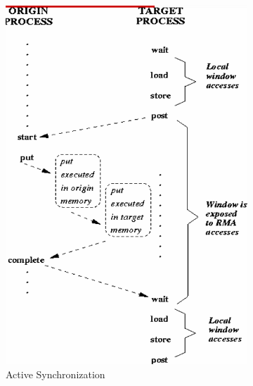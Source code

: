 \documentclass[12pt]{book}
\begin{document}
\begin{figure}[h!]
    \centering
    \begin{subfigure}[b]{0.3\linewidth}
        \centering
        \includegraphics[width=\linewidth]{images/sync_examp1.png}
        \caption{Active Synchronization}
        \label{fig:sync_examp1}
    \end{subfigure}
    \hfill
    \begin{subfigure}[b]{0.3\linewidth}
        \centering

\end{subfigure}
\end{figure}
\end{document}
